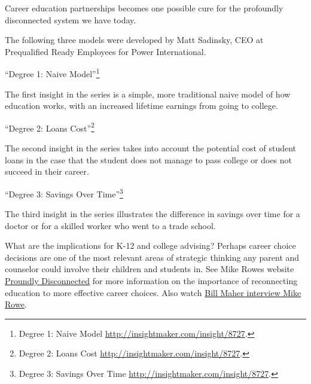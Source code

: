 \documentclass[]{memoir}
\begin{document}
Career education partnerships becomes one possible cure for the
profoundly disconnected system we have today.

The following three models were developed by Matt Sadinsky, CEO at
Prequalified Ready Employees for Power International.

``Degree 1: Naive Model''\footnote{Degree 1: Naive Model
  \url{http://insightmaker.com/insight/8727}.}

\FloatBarrier 

\begin{model}[frametitle={Model: Degree 1: Naive Model}] 

 The first insight in the series is a simple, more traditional naive model of how education works, with an increased lifetime earnings from going to college.




 \end{model}

``Degree 2: Loans Cost''\footnote{Degree 2: Loans Cost
  \href{http://insightmaker.com/insight/8729}{http://insightmaker.com/insight/8727}.}

\FloatBarrier 

\begin{model}[frametitle={Model: Degree 2: Loans Cost}] 

 The second insight in the series takes into account the potential cost of student loans in the case that the student does not manage to pass college or does not succeed in their career.




 \end{model}

``Degree 3: Savings Over Time''\footnote{Degree 3: Savings Over Time
  \href{http://insightmaker.com/insight/8735}{http://insightmaker.com/insight/8727}.}

\FloatBarrier 

\begin{model}[frametitle={Model: Degree 3: Savings Over Time}] 

 The third insight in the series illustrates the difference in savings over time for a doctor or for a skilled worker who went to a trade school.




 \end{model}

What are the implications for K-12 and college advising? Perhaps career
choice decisions are one of the most relevant areas of strategic
thinking any parent and counselor could involve their children and
students in. See Mike Rowes website
\href{http://profoundlydisconnected.com/alternative-education/}{Proundly
Disconnected} for more information on the importance of reconnecting
education to more effective career choices. Also watch
\href{http://roadshow.slate.com/mike-rowe-on-bill-maher-time-to-close-the-skills-gap/}{Bill
Maher interview Mike Rowe}.
\end{document}
